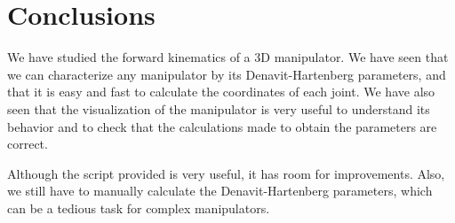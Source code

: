 \section{Conclusions}
We have studied the forward kinematics of a 3D manipulator. We have seen that we can characterize any manipulator by its Denavit-Hartenberg parameters, and that it is easy and fast to calculate the coordinates of each joint. 
We have also seen that the visualization of the manipulator is very useful to understand its behavior and to check that the calculations made to obtain the parameters are correct.

\bigskip Although the script provided is very useful, it has room for improvements. Also, we still have to manually calculate the Denavit-Hartenberg parameters, which can be a tedious task for complex manipulators.
